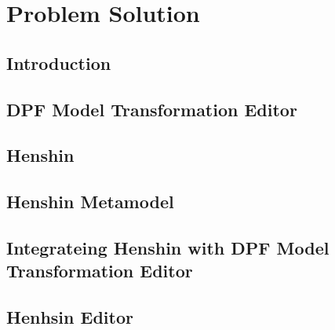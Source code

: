
\chapter{Problem Solution} %

\label{Chapter6} %



\section{Introduction}

\section{DPF Model Transformation Editor}

\section{Henshin}

\section{Henshin Metamodel}

\section{Integrateing Henshin with DPF Model Transformation Editor}

\section{Henhsin Editor}

